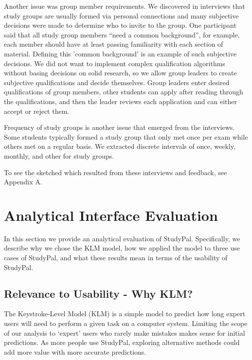 \documentclass[conference]{IEEEtran}
\begin{document}
Another issue was group member requirements.
We discovered in interviews that study groups are usually formed via personal connections and many subjective decisions were made to determine who to invite to the group.
One participant said that all study group members ``need a common background'', for example, each member should have at least passing familiarity with each section of material.
Defining this 'common background' is an example of such subjective decisions.
We did not want to implement complex qualification algorithms without basing decisions on solid research, so we allow group leaders to create subjective qualifications and decide themselves.
Group leaders enter desired qualifications of group members, other students can apply after reading through the qualifications, and then the leader reviews each application and can either accept or reject them.


Frequency of study groups is another issue that emerged from the interviews.
Some students typically formed a study group that only met once per exam while others met on a regular basis.
We extracted discrete intervals of once, weekly, monthly, and other for study groups.


To see the sketched which resulted from these interviews and feedback, see Appendix A.



\section{Analytical Interface Evaluation}
 

 
In this section we provide an analytical evaluation of StudyPal.
Specifically, we describe why we chose the KLM model\cite{Card:KLM}, how we applied the model to three use cases of StudyPal, and what these results mean in terms of the usability of StudyPal.

\subsection{Relevance to Usability - Why KLM?}
The Keystroke-Level Model (KLM) \cite{Card:KLM} is a simple model to predict how long expert users will need to perform a given task on a computer system.
Limiting the scope of our analysis to `expert' users who rarely make mistakes makes sense for initial predictions.
As more people use StudyPal, exploring alternative methods could add more value with more accurate predictions.
\end{document}

